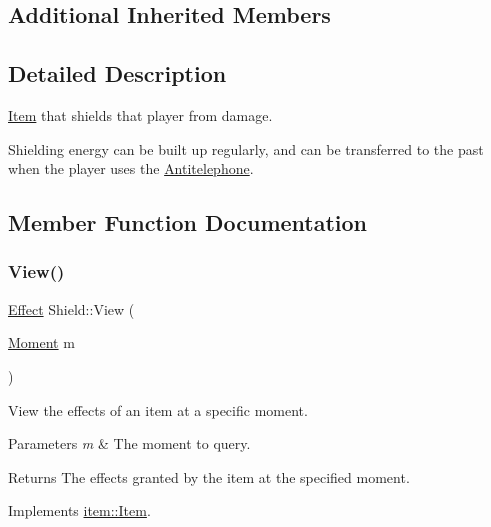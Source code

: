 \subsection*{Additional Inherited Members}


\subsection{Detailed Description}
\hyperlink{classitem_1_1_item}{Item} that shields that player from damage. 

Shielding energy can be built up regularly, and can be transferred to the past when the player uses the \hyperlink{classitem_1_1_antitelephone}{Antitelephone}. 

\subsection{Member Function Documentation}
\mbox{\label{classitem_1_1_shield_abdc88bd6d0a4d6021805fa3097f47633}} 
\subsubsection{\texorpdfstring{View()}{View()}}
{\footnotesize\ttfamily \hyperlink{classitem_1_1_effect}{Effect} Shield\+::\+View (\begin{DoxyParamCaption}\item[{\hyperlink{classtimeplane_1_1_moment}{Moment}}]{m }\end{DoxyParamCaption})\hspace{0.3cm}{\ttfamily [virtual]}}



View the effects of an item at a specific moment. 


\begin{DoxyParams}{Parameters}
{\em m} & The moment to query. \\
\hline
\end{DoxyParams}
\begin{DoxyReturn}{Returns}
The effects granted by the item at the specified moment. 
\end{DoxyReturn}


Implements \hyperlink{classitem_1_1_item_a400dfeabc4056d36bfd348ff9c51cf7d}{item\+::\+Item}.

\mbox{\label{classitem_1_1_shield_a1a246374ed47a4d9849bad97091c42cb}} 
